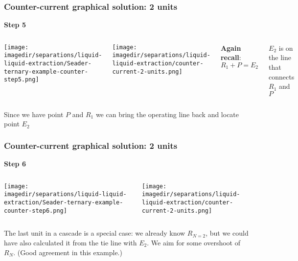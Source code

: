 \begin{frame}\frametitle{Counter-current graphical solution: 2 units}
	\textbf{Step 5}
	\begin{columns}[t]
			\begin{center}
				\texttt{[image: \\imagedir/separations/liquid-liquid-extraction/Seader-ternary-example-counter-step5.png]}
			\end{center}
			\begin{center}
				\texttt{[image: \\imagedir/separations/liquid-liquid-extraction/counter-current-2-units.png]}
			\end{center}
			\textbf{Again recall}: 
			\vspace{-12pt}
			\[	R_1 + P = E_2 \]
			
			\vspace{-12pt}
			{\color{myOrange}\tiny$E_2$ is on the line that connects $R_1$ and $P$}
	\end{columns}
	\vspace{12pt}
	Since we have point $P$ and $R_1$ we can bring the operating line back and locate point $E_2$
	\vfill
\end{frame}

\begin{frame}\frametitle{Counter-current graphical solution: 2 units}
	\textbf{Step 6}
	\begin{columns}[t]
			\begin{center}
				\texttt{[image: \\imagedir/separations/liquid-liquid-extraction/Seader-ternary-example-counter-step6.png]}
			\end{center}
			\begin{center}
				\texttt{[image: \\imagedir/separations/liquid-liquid-extraction/counter-current-2-units.png]}
			\end{center}
	\end{columns}
	The last unit in a cascade is a special case: we already know $R_{N=2}$, but we could have also calculated it from the tie line with $E_2$. We aim for some overshoot of $R_N$. {\scriptsize (Good agreement in this example.)}
\end{frame}

